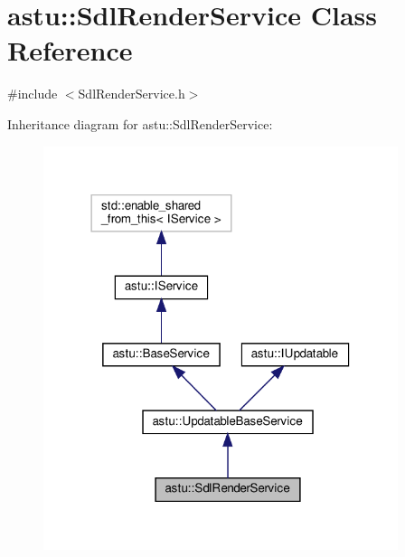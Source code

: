 \hypertarget{classastu_1_1SdlRenderService}{}\section{astu\+:\+:Sdl\+Render\+Service Class Reference}
\label{classastu_1_1SdlRenderService}


{\ttfamily \#include $<$Sdl\+Render\+Service.\+h$>$}



Inheritance diagram for astu\+:\+:Sdl\+Render\+Service\+:\nopagebreak
\begin{figure}[H]
\begin{center}
\leavevmode
\includegraphics[width=294pt]{classastu_1_1SdlRenderService__inherit__graph}
\end{center}
\end{figure}


